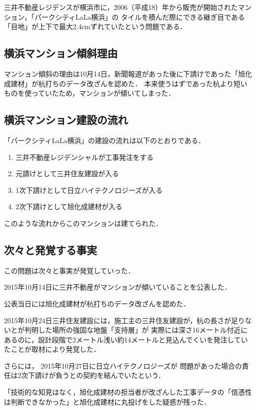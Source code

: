 {三井不動産レジデンスが横浜市に，2006（平成18）年から販売が開始されたマンション，「パークシティLaLa横浜」の
タイルを積んだ際にできる継ぎ目である「目地」が上下で最大2.4cmずれていたという問題である．



\subsection{横浜マンション傾斜理由}
マンション傾斜の理由は10月14日，新聞報道があった後に下請けであった「旭化成建材」が杭打ちのデータ改ざんを認めた．
本来使うはずであった杭より短いものを使っていたため，マンションが傾いてしまった．


\subsection{横浜マンション建設の流れ}
「パークシティLaLa横浜」の建設の流れは以下のとおりである．

\begin{enumerate}
  \item 三井不動産レジデンシャルが工事発注をする
  \item 元請けとして三井住友建設が入る
  \item 1次下請けとして日立ハイテクノロジーズが入る
  \item 2次下請けとして旭化成建材が入る
\end{enumerate}

このような流れからこのマンションは建てられた．

\subsection{次々と発覚する事実}
この問題は次々と事実が発覚していった．

2015年10月14日に三井不動産がマンションが傾いていることを公表した．

公表当日には旭化成建材が杭打ちのデータ改ざんを認めた．


2015年10月24日三井住友建設には，施工主の三井住友建設が，杭の長さが足りないとが判明した場所の強固な地盤「支持層」が
実際には深さ16メートル付近にあるのに，設計段階で2メートル浅い約14メートルと見込んでくいを発注していたことが取材により発覚した．

さらには，
2015年10月27日に日立ハイテクノロジーズが
問題があった場合の責任は2次下請けが負うとの契約を結んでいたという．

「技術的な知見はなく，旭化成建材の担当者が改ざんした工事データの「信憑性は判断できなかった」と旭化成建材に丸投げをした疑惑が残った．


}
